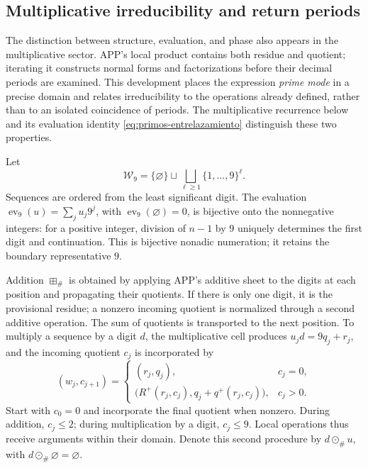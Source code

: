 \subsection{Multiplicative irreducibility and return periods}
\label{primos-retornos}

The distinction between structure, evaluation, and phase also appears in
the multiplicative sector. APP's local product contains both residue and
quotient; iterating it constructs normal forms and factorizations before
their decimal periods are examined. This development places the expression
\emph{prime mode} in a precise domain and relates irreducibility to the
operations already defined, rather than to an isolated coincidence
of periods. The multiplicative recurrence below and its evaluation
identity \eqref{eq:primos-entrelazamiento} distinguish these two properties.

Let
\[
 \mathcal W_9=\{\varnothing\}\sqcup
 \bigsqcup_{\ell\geq1}\{1,\ldots,9\}^{\ell}.
\]
Sequences are ordered from the least significant digit. The evaluation
\(\operatorname{ev}_9(u)=\sum_j u_j9^j\), with
\(\operatorname{ev}_9(\varnothing)=0\), is bijective onto the nonnegative
integers: for a positive integer, division of \(n-1\) by \(9\)
uniquely determines the first digit and continuation. This is bijective
nonadic numeration; it retains the boundary representative \(9\).

Addition \(\boxplus_\#\) is obtained by applying APP's additive sheet
to the digits at each position and propagating their quotients. If there
is only one digit, it is the provisional residue; a nonzero incoming
quotient is normalized through a second additive operation. The sum of
quotients is transported to the next position. To multiply a sequence by
a digit \(d\), the multiplicative cell produces
\(u_jd=9q_j+r_j\), and the incoming quotient \(c_j\) is incorporated by
\[
 (w_j,c_{j+1})=
 \begin{cases}
 (r_j,q_j),&c_j=0,\\
 \bigl(R^+(r_j,c_j),q_j+q^+(r_j,c_j)\bigr),&c_j>0.
 \end{cases}
\]
Start with \(c_0=0\) and incorporate the final quotient when nonzero.
During addition, \(c_j\leq2\); during multiplication by a digit,
\(c_j\leq9\). Local operations thus receive arguments within
their domain. Denote this second procedure by \(d\odot_\#u\),
with \(d\odot_\#\varnothing=\varnothing\).

